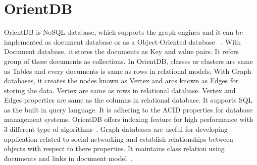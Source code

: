 \section{OrientDB}

OrientDB is NoSQL database, which supports the graph engines and it can be 
implemented as document database or as a Object-Oriented database
~\cite{hid-sp18-520-OrientDB}.
With Document database, it stores the documents as Key and value pairs. 
It refers group of these documents as collections. In OrientDB, classes or 
clusters are same as Tables and every documents is same as rows in 
relational models. With Graph databases, it creates the nodes known 
as Vertex and arcs known as Edges for storing the data. Vertex are same 
as rows in relational database. Vertex and Edges properties are same 
as the columns in relational database. It supports SQL as the built 
in query language. It is adhering to the ACID properties for database 
management systems. OrientDB offers indexing feature for high performance 
with 3 different type of algorithms~\cite{hid-sp18-520-OrientDBconcepts}.
Graph databases are useful for developing application related to social 
networking and establish relationships between objects with respect to 
there properties. It maintains class relation using documents and links 
in document model~\cite{hid-sp18-520-OrientDB-graph}.
